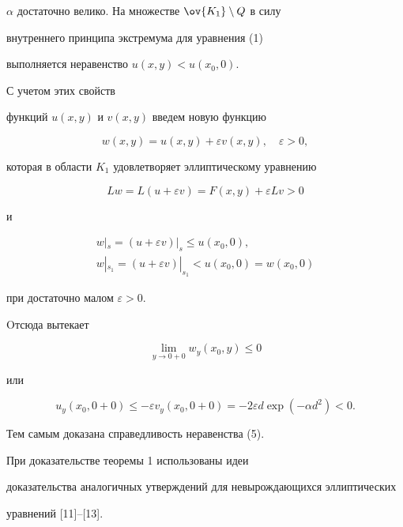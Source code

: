 \begin{pf}
$\alpha$ достаточно велико. На множестве $\ov {K_1}\setminus Q$ в силу 


внутреннего принципа экстремума для уравнения (1)


выполняется неравенство $u(x,y)<u(x_0,0)$. 


С учетом этих свойств


функций $u(x,y)$ и $v(x,y)$ введем новую функцию


$$


w(x,y)=u(x,y)+\varepsilon v(x,y),\quad \varepsilon >0,


$$


которая в области $K_1$ удовлетворяет эллиптическому уравнению 


$$


Lw=L(u+\varepsilon v)=F(x,y)+\varepsilon Lv>0


$$


и 


\begin{gather*}


w|_s=(u+\varepsilon v)|_s\le u(x_0,0), \\


%


w|_{s_1}=(u+\varepsilon v)|_{s_1}<u(x_0,0)=w(x_0,0)


\end{gather*}


при достаточно малом $\varepsilon >0$.


Oтсюда вытекает


$$\lim \limits_{y\to 0+0}w_y(x_0,y)\le 0


$$


или


$$


u_y(x_0,0+0)\le -\varepsilon v_y(x_0,0+0)=-2\varepsilon 


d\exp(-\alpha d^2)<0.


$$


Тем самым доказана справедливость неравенства (5).


\end{pf}





\begin{note}


При доказательстве теоремы 1 использованы идеи 


доказательства аналогичных утверждений для невырождающихся эллиптических 


уравнений [11]--[13].


\end{note}





